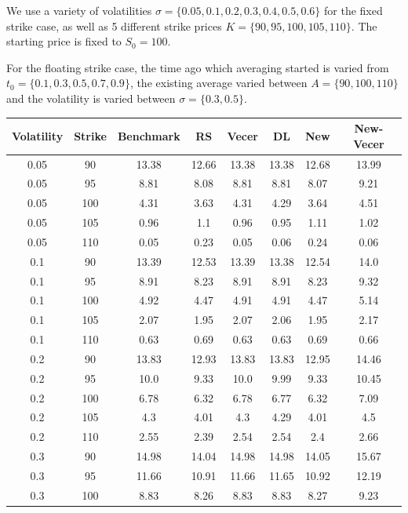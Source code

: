 \documentclass{article}
\begin{document}
We use a variety of volatilities \(\sigma = \{0.05, 0.1, 0.2, 0.3, 0.4, 0.5, 0.6\}\) for the fixed strike case, as well as 5 different strike prices \(K = \{90, 95, 100, 105, 110\}\). The starting price is fixed to \(S_0 = 100\).

For the floating strike case, the time ago which averaging started is varied from \(t_0 = \{0.1, 0.3, 0.5, 0.7, 0.9\}\), the existing average varied between \(A = \{90, 100, 110\}\) and the volatility is varied between \(\sigma = \{0.3, 0.5\}\).

\scriptsize
\begin{table}[H]
  \begin{tabular}{|c|c|c|c|c|c|c|c|}
  \hline
  Volatility & Strike & Benchmark & RS & Vecer & DL & New & New-Vecer \\
  \hline
  0.05 & 90 & 13.38 & 12.66 & 13.38 & 13.38 & 12.68 & 13.99 \\
  0.05 & 95 & 8.81 & 8.08 & 8.81 & 8.81 & 8.07 & 9.21 \\
  0.05 & 100 & 4.31 & 3.63 & 4.31 & 4.29 & 3.64 & 4.51 \\
  0.05 & 105 & 0.96 & 1.1 & 0.96 & 0.95 & 1.11 & 1.02 \\
  0.05 & 110 & 0.05 & 0.23 & 0.05 & 0.06 & 0.24 & 0.06 \\
  0.1 & 90 & 13.39 & 12.53 & 13.39 & 13.38 & 12.54 & 14.0 \\
  0.1 & 95 & 8.91 & 8.23 & 8.91 & 8.91 & 8.23 & 9.32 \\
  0.1 & 100 & 4.92 & 4.47 & 4.91 & 4.91 & 4.47 & 5.14 \\
  0.1 & 105 & 2.07 & 1.95 & 2.07 & 2.06 & 1.95 & 2.17 \\
  0.1 & 110 & 0.63 & 0.69 & 0.63 & 0.63 & 0.69 & 0.66 \\
  0.2 & 90 & 13.83 & 12.93 & 13.83 & 13.83 & 12.95 & 14.46 \\
  0.2 & 95 & 10.0 & 9.33 & 10.0 & 9.99 & 9.33 & 10.45 \\
  0.2 & 100 & 6.78 & 6.32 & 6.78 & 6.77 & 6.32 & 7.09 \\
  0.2 & 105 & 4.3 & 4.01 & 4.3 & 4.29 & 4.01 & 4.5 \\
  0.2 & 110 & 2.55 & 2.39 & 2.54 & 2.54 & 2.4 & 2.66 \\
  0.3 & 90 & 14.98 & 14.04 & 14.98 & 14.98 & 14.05 & 15.67 \\
  0.3 & 95 & 11.66 & 10.91 & 11.66 & 11.65 & 10.92 & 12.19 \\
  0.3 & 100 & 8.83 & 8.26 & 8.83 & 8.83 & 8.27 & 9.23 \\

\end{tabular}
\end{table}
\end{document}
